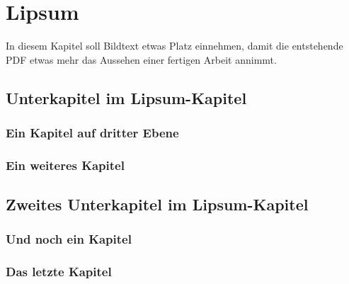 \section{Lipsum}\label{lipsum}

In diesem Kapitel soll Bildtext etwas Platz einnehmen,
damit die entstehende PDF etwas mehr das Aussehen 
einer fertigen Arbeit annimmt.

\subsection{Unterkapitel im Lipsum-Kapitel}
  \lipsum[1-2] %
  \subsubsection{Ein Kapitel auf dritter Ebene}
    \lipsum[3-5] %
  \subsubsection{Ein weiteres Kapitel}
    \lipsum[4-6] %

\subsection{Zweites Unterkapitel im Lipsum-Kapitel}
  \lipsum[7-8] %
  \subsubsection{Und noch ein Kapitel}
    \lipsum[9-10] %
  \subsubsection{Das letzte Kapitel}
    \lipsum[11]
